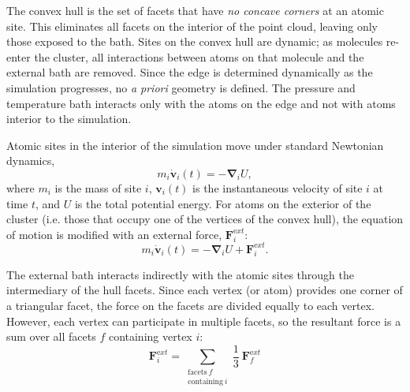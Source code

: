 \documentclass[]{book}
\begin{document}
The convex hull is the set of facets that have {\it no concave
  corners} at an atomic site.\cite{Barber96,EDELSBRUNNER:1994oq} This
eliminates all facets on the interior of the point cloud, leaving only
those exposed to the bath. Sites on the convex hull are dynamic; as
molecules re-enter the cluster, all interactions between atoms on that
molecule and the external bath are removed.  Since the edge is
determined dynamically as the simulation progresses, no {\it a priori}
geometry is defined. The pressure and temperature bath interacts only
with the atoms on the edge and not with atoms interior to the
simulation.

Atomic sites in the interior of the simulation move under standard
Newtonian dynamics,
\begin{equation}
m_i \dot{\mathbf v}_i(t)=-{\mathbf \nabla}_i U,
\label{eq:Newton}
\end{equation}
where $m_i$ is the mass of site $i$, ${\mathbf v}_i(t)$ is the
instantaneous velocity of site $i$ at time $t$, and $U$ is the total
potential energy.  For atoms on the exterior of the cluster
(i.e. those that occupy one of the vertices of the convex hull), the
equation of motion is modified with an external force, ${\mathbf
  F}_i^{\mathrm ext}$:
\begin{equation}
m_i \dot{\mathbf v}_i(t)=-{\mathbf \nabla}_i U + {\mathbf F}_i^{\mathrm ext}.
\end{equation}

The external bath interacts indirectly with the atomic sites through
the intermediary of the hull facets.  Since each vertex (or atom)
provides one corner of a triangular facet, the force on the facets are
divided equally to each vertex.  However, each vertex can participate
in multiple facets, so the resultant force is a sum over all facets
$f$ containing vertex $i$:
\begin{equation}
{\mathbf F}_{i}^{\mathrm ext} = \sum_{\begin{array}{c}\mathrm{facets\
    } f \\ \mathrm{containing\ } i\end{array}} \frac{1}{3}\  {\mathbf
  F}_f^{\mathrm ext}
\end{equation}
\end{document}
